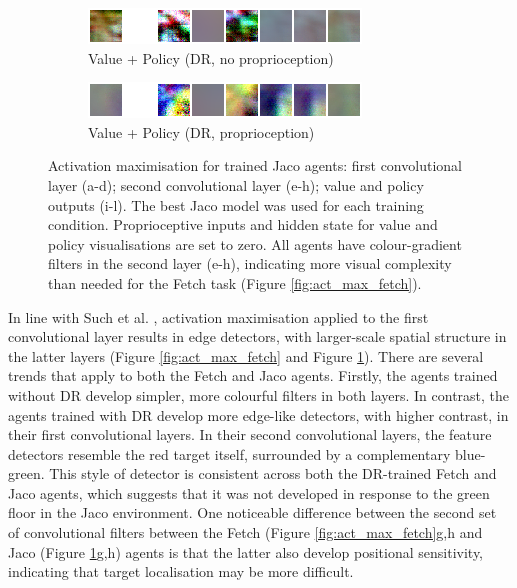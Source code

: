 \begin{figure}
  \begin{subfigure}{0.49\textwidth}
    \includegraphics[width=\textwidth]{figures/chapter6/act_max/jaco_dr_noprop_value_policy}
    \caption{Value + Policy (DR, no proprioception)}
  \end{subfigure}
  \begin{subfigure}{0.49\textwidth}
    \includegraphics[width=\textwidth]{figures/chapter6/act_max/jaco_dr_prop_value_policy}
    \caption{Value + Policy (DR, proprioception)}
  \end{subfigure}
  \caption{Activation maximisation for trained Jaco agents: first convolutional layer (a-d); second convolutional layer (e-h); value and policy outputs (i-l). The best Jaco model was used for each training condition. Proprioceptive inputs and hidden state for value and policy visualisations are set to zero. All agents have colour-gradient filters in the second layer (e-h), indicating more visual complexity than needed for the Fetch task (Figure \ref{fig:act_max_fetch}).}
  \label{fig:act_max_jaco}
\end{figure}

In line with Such et al. \cite{such2018atari}, activation maximisation
applied to the first convolutional layer results in edge detectors, with
larger-scale spatial structure in the latter layers (Figure
\ref{fig:act_max_fetch} and Figure \ref{fig:act_max_jaco}). There are
several trends that apply to both the Fetch and Jaco agents. Firstly,
the agents trained without DR develop simpler, more colourful filters in
both layers. In contrast, the agents trained with DR develop more
edge-like detectors, with higher contrast, in their first convolutional
layers. In their second convolutional layers, the feature detectors
resemble the red target itself, surrounded by a complementary
blue-green. This style of detector is consistent across both the
DR-trained Fetch and Jaco agents, which suggests that it was not
developed in response to the green floor in the Jaco environment. One
noticeable difference between the second set of convolutional filters
between the Fetch (Figure \ref{fig:act_max_fetch}g,h and Jaco (Figure
\ref{fig:act_max_jaco}g,h) agents is that the latter also develop
positional sensitivity, indicating that target localisation may be more
difficult.

